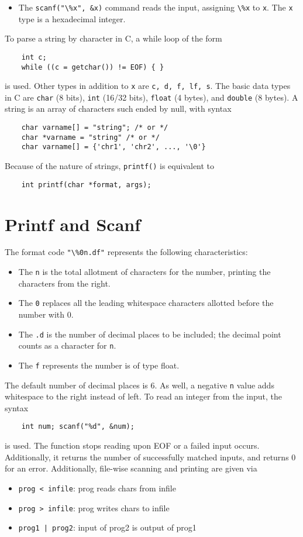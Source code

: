\documentclass{tufte-book}
\begin{document}
\begin{fullwidth}
\begin{itemize}
    \item The \lstinline{scanf("\%x", &x)} command reads the input, assigning \lstinline{\%x} to \lstinline{x}. The \lstinline{x} type is a hexadecimal integer.
\end{itemize}
To parse a string by character in C, a while loop of the form
\begin{lstlisting}
    int c;
    while ((c = getchar()) != EOF) { }
\end{lstlisting}
is used. Other types in addition to \lstinline{x} are \lstinline{c, d, f, lf, s}. The basic data types in C are \lstinline{char} (8 bits), \lstinline{int} (16/32 bits), \lstinline{float} (4 bytes), and \lstinline{double} (8 bytes). A string is an array of characters such ended by null, with syntax
\begin{lstlisting}
    char varname[] = "string"; /* or */
    char *varname = "string" /* or */
    char varname[] = {'chr1', 'chr2', ..., '\0'}
\end{lstlisting}
Because of the nature of strings, \lstinline{printf()} is equivalent to
\begin{lstlisting}
    int printf(char *format, args);
\end{lstlisting}

\section{Printf and Scanf}
The format code \lstinline{"\%0n.df"} represents the following characteristics:
\begin{itemize}
    \item The \lstinline{n} is the total allotment of characters for the number, printing the characters from the right.
    \item The \lstinline{0} replaces all the leading whitespace characters allotted before the number with 0.
    \item The \lstinline{.d} is the number of decimal places to be included; the decimal point counts as a character for \lstinline{n}.
    \item The \lstinline{f} represents the number is of type float.
\end{itemize}
The default number of decimal places is 6. As well, a negative \lstinline{n} value adds whitespace to the right instead of left. To read an integer from the input, the syntax
\begin{lstlisting}
    int num; scanf("%d", &num);
\end{lstlisting}
is used. The function stops reading upon EOF or a failed input occurs. Additionally, it returns the number of successfully matched inputs, and returns 0 for an error. Additionally, file-wise scanning and printing are given via
\begin{itemize}
    \item \lstinline{prog < infile}: prog reads chars from infile
    \item \lstinline{prog > infile}: prog writes chars to infile
    \item \lstinline{prog1 | prog2}: input of prog2 is output of prog1
\end{itemize}


\end{fullwidth}
\end{document}
